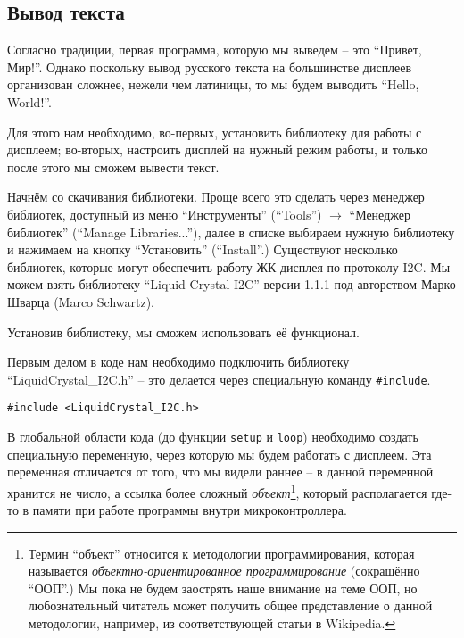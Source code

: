 \documentclass[../sparc.tex]{subfiles}
\begin{document}

\subsection{Вывод текста}


Согласно традиции, первая программа, которую мы выведем -- это ``Привет, Мир!''.
Однако поскольку вывод русского текста на большинстве дисплеев организован
сложнее, нежели чем латиницы, то мы будем выводить ``Hello, World!''.

Для этого нам необходимо, во-первых, установить библиотеку для работы с
дисплеем; во-вторых, настроить дисплей на нужный режим работы, и только после
этого мы сможем вывести текст.

Начнём со скачивания библиотеки.  Проще всего это сделать через менеджер
библиотек, доступный из меню ``Инструменты'' (``Tools'') $\rightarrow$ ``Менеджер
библиотек'' (``Manage Libraries...''), далее в списке выбираем нужную библиотеку
и нажимаем на кнопку ``Установить'' (``Install''.)  Существуют несколько
библиотек, которые могут обеспечить работу ЖК-дисплея по протоколу \gls{I2C}.
Мы можем взять библиотеку ``Liquid Crystal I2C'' версии 1.1.1 под авторством
Марко Шварца (Marco Schwartz).

Установив библиотеку, мы сможем использовать её функционал.

Первым делом в коде нам необходимо подключить библиотеку
``LiquidCrystal\_I2C.h'' -- это делается через специальную команду
\texttt{\#include}.

\begin{verbatim}
#include <LiquidCrystal_I2C.h>
\end{verbatim}

В глобальной области кода (до функции \texttt{setup} и \texttt{loop}) необходимо
создать специальную переменную, через которую мы будем работать с дисплеем. Эта
переменная отличается от того, что мы видели раннее -- в данной переменной
хранится не число, а ссылка более сложный \emph{объект}\footnote{Термин
``объект'' относится к методологии программирования, которая называется
\emph{объектно-ориентированное программирование} (сокращённо ``ООП''.)  Мы пока
не будем заострять наше внимание на теме ООП, но любознательный читатель может
получить общее представление о данной методологии, например, из соответствующей
статьи в Wikipedia.}, который располагается где-то в памяти при работе программы
внутри микроконтроллера.
\end{document}
